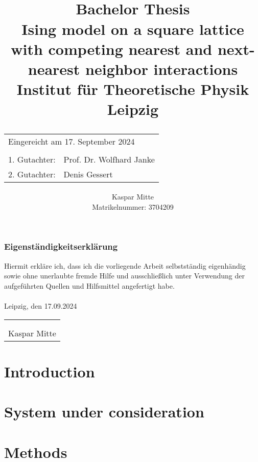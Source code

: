 \documentclass[openany]{report}
\title{
        {} \\
        \vspace{1cm}
        {\large Bachelor Thesis} \\ 
        {Ising model on a square lattice with competing nearest and next-nearest neighbor interactions} \\
        {\large  Institut für Theoretische Physik Leipzig} \\
        \vspace{7cm} 
        \begin{table}[b]
          \begin{tabular}{ll}
            \multicolumn{2}{l}{\footnotesize{Eingereicht am 17. September 2024}} \\
            \multicolumn{2}{l}{} \\
            1. Gutachter: & Prof. Dr. Wolfhard Janke \\
            2. Gutachter: & Denis Gessert \\
          \end{tabular}
        \end{table}
      }
\author{Kaspar Mitte \\ Matrikelnummer: 3704209}
\date{}
\begin{document}
\maketitle %



\newpage

\subsection*{Eigenständigkeitserklärung}
Hiermit erkläre ich, dass ich die vorliegende Arbeit selbstständig eigenhändig sowie ohne unerlaubte fremde Hilfe und ausschließlich 
unter Verwendung der aufgeführten Quellen und Hilfsmittel angefertigt habe.\\
\\
Leipzig, den 17.09.2024 \\
\begin{tabular}{m{4cm}}
  \\
  \\
  \\
  \hline
  \footnotesize{Kaspar Mitte}
\end{tabular}

\newpage

\begin{abstract}\end{abstract}

\newpage

\tableofcontents


\chapter{Introduction}

  

\chapter{System under consideration}

  

  

\chapter{Methods}
\end{document}
